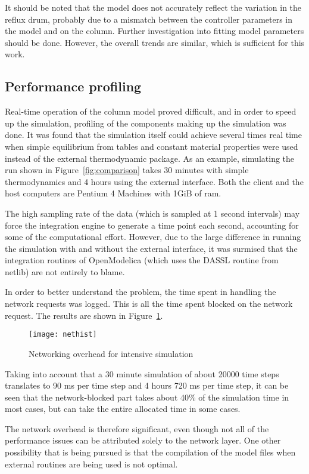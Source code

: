 It should be noted that the model does not accurately reflect the variation in
the reflux drum, probably due to a mismatch between the controller parameters in
the model and on the column.  Further investigation into fitting model
parameters should be done.  However, the overall trends are similar, which is
sufficient for this work.

\subsection{Performance profiling}
Real-time operation of the column model proved difficult, and in order
to speed up the simulation, profiling of the components making up the
simulation was done.  It was found that the simulation itself could
achieve several times real time when simple equilibrium from tables
and constant material properties were used instead of the external
thermodynamic package.  As an example, simulating the run shown in
Figure~\ref{fig:comparison} takes 30 minutes with simple
thermodynamics and 4 hours using the external interface.  Both the client and
the host computers are Pentium 4 Machines with 1GiB of ram.

The high sampling rate of the data (which is sampled at 1 second
intervals) may force the integration engine to generate a time point
each second, accounting for some of the computational effort.
However, due to the large difference in running the simulation with
and without the external interface, it was surmised that the
integration routines of OpenModelica (which uses the DASSL routine
from netlib) are not entirely to blame.

In order to better understand the problem, the time spent in
handling the network requests was logged.  This is all the time spent
blocked on the network request.  The results are shown in
Figure~\ref{fig:overhead}.
\begin{figure}[htbp]
  \centering
  \texttt{[image: nethist]}
  \caption{Networking overhead for intensive simulation}
  \label{fig:overhead}
\end{figure}
Taking into account that a 30 minute simulation of about 20000 time
steps translates to 90 ms per time step and 4 hours 720 ms per time
step, it can be seen that the network-blocked part takes about 40\% of
the simulation time in most cases, but can take the entire allocated
time in some cases.  

The network overhead is therefore significant, even though not all of
the performance issues can be attributed solely to the network layer.
One other possibility that is being pursued is that the compilation of the
model files when external routines are being used is not optimal.

